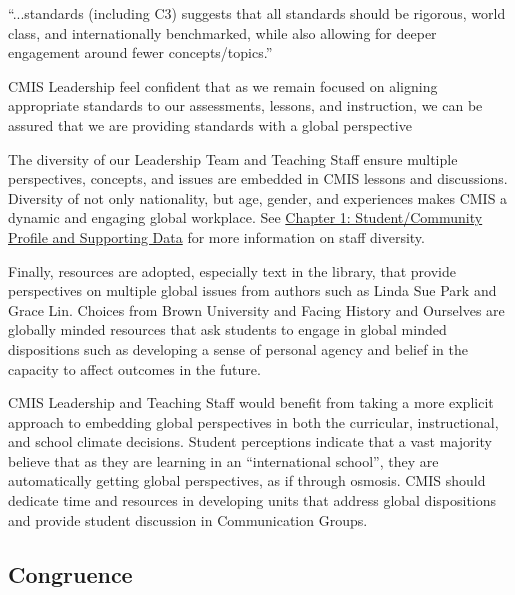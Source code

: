 \documentclass{report}
\begin{document}
\begin{findings}
“...standards (including C3) suggests that all standards should be rigorous, world class, and internationally benchmarked, while also allowing for deeper engagement around fewer concepts/topics.” 

CMIS Leadership feel confident that as we remain focused on aligning appropriate standards to our assessments, lessons, and instruction, we can be assured that we are providing standards with a global perspective 


The diversity of our Leadership Team and Teaching Staff ensure multiple perspectives, concepts, and issues are embedded in CMIS lessons and discussions. Diversity of not only nationality, but age, gender, and experiences makes CMIS a dynamic and engaging global workplace. See \href{https://docs.google.com/a/cmis.ac.th/document/d/1xv5c4vDAjs6UksU69e5l8UEZu0kYYJblDoKUj-29iXE/edit?usp=sharing}{Chapter 1: Student/Community Profile and Supporting Data} for more information on staff diversity. 


Finally, resources are adopted, especially text in the library, that provide perspectives on multiple global issues from authors such as Linda Sue Park and Grace Lin. Choices from Brown University and Facing History and Ourselves are globally minded resources that ask students to engage in global minded dispositions such as developing a sense of personal agency and belief in the capacity to affect outcomes in the future. 


CMIS Leadership and Teaching Staff would benefit from taking a more explicit approach to embedding global perspectives in both the curricular,  instructional, and school climate decisions. Student perceptions indicate that a vast majority believe that as they are learning in an “international school”, they are automatically getting global perspectives, as if through osmosis.  CMIS should dedicate time and resources in developing units that address global dispositions and provide student discussion in Communication Groups. 
\end{findings}

\subsection{Congruence}

\end{document}
